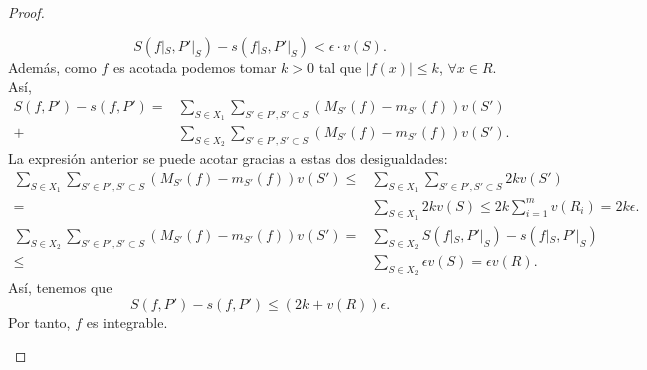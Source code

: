 \begin{proof}
\begin{description}
\[S\left(f|_{S}, P'|_{S}\right)-s\left(f|_{S}, P'|_{S}\right)<\epsilon \cdot v\left(S\right) .\]
Además, como $\displaystyle f $ es acotada podemos tomar $\displaystyle k > 0 $ tal que $\displaystyle \left|f\left(x\right)\right| \leq k $, $\displaystyle \forall x \in R $. Así,
\[
\begin{split}
	S\left(f,P'\right)-s\left(f,P'\right)=&\sum^{}_{S \in X_{1}}\sum^{}_{S' \in P', S' \subset S}\left(M_{S'}\left(f\right)-m_{S'}\left(f\right)\right)v\left(S'\right) \\ +&\sum^{}_{S \in X_{2}}\sum^{}_{S'\in P', S' \subset S}\left(M_{S'}\left(f\right)-m_{S'}\left(f\right)\right)v\left(S'\right).
\end{split}
\]
La expresión anterior se puede acotar gracias a estas dos desigualdades:
\[
\begin{split}
	\sum^{}_{S \in X_{1}}\sum^{}_{S'\in P', S' \subset S}\left(M_{S'}\left(f\right)-m_{S'}\left(f\right)\right)v\left(S'\right) \leq & \sum^{}_{S \in X_{1}}\sum^{}_{S'\in P', S' \subset S}2kv\left(S'\right) \\
	= & \sum^{}_{S \in X_{1}}2kv\left(S\right) \leq 2k\sum^{m}_{i = 1}v\left(R_{i}\right)=2k\epsilon  .
\end{split}
\]
\[
\begin{split}
	\sum^{}_{S \in X_{2}}\sum^{}_{S'\in P', S' \subset S}\left(M_{S'}\left(f\right)-m_{S'}\left(f\right)\right)v\left(S'\right) = & \sum^{}_{S \in X_{2}}S\left(f|_{S}, P'|_{S}\right)-s\left(f|_{S}, P'|_{S}\right) \\
	\leq & \sum^{}_{S \in X_{2}}\epsilon v\left(S\right)=\epsilon v\left(R\right) .
\end{split}
\]
Así, tenemos que 
\[S\left(f,P'\right)-s\left(f,P'\right)\leq \left(2k+v\left(R\right)\right)\epsilon  .\]
Por tanto, $\displaystyle f $ es integrable.
\end{description}
\end{proof}



